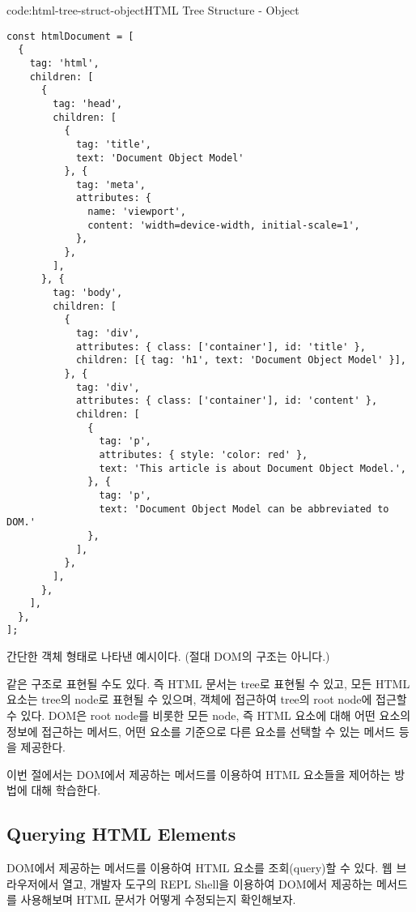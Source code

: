 \begin{codeenv}{code:html-tree-struct-object}{HTML Tree Structure - Object}\begin{verbatim}
const htmlDocument = [
  {
    tag: 'html',
    children: [
      {
        tag: 'head',
        children: [
          {
            tag: 'title',
            text: 'Document Object Model'
          }, {
            tag: 'meta',
            attributes: {
              name: 'viewport',
              content: 'width=device-width, initial-scale=1',
            },
          },
        ],
      }, {
        tag: 'body',
        children: [
          {
            tag: 'div',
            attributes: { class: ['container'], id: 'title' },
            children: [{ tag: 'h1', text: 'Document Object Model' }],
          }, {
            tag: 'div',
            attributes: { class: ['container'], id: 'content' },
            children: [
              {
                tag: 'p',
                attributes: { style: 'color: red' },
                text: 'This article is about Document Object Model.',
              }, {
                tag: 'p',
                text: 'Document Object Model can be abbreviated to DOM.'
              },
            ],
          },
        ],
      },
    ],
  },
];
\end{verbatim}
\end{codeenv}

\는 \을 간단한 객체 형태로 나타낸 예시이다. (절대 DOM의 구조는 아니다.)

    {}

\은 \와 같은 구조로 표현될 수도 있다. 즉 HTML 문서는 tree로 표현될 수 있고, 모든 HTML 요소는 tree의 node로 표현될 수 있으며,  객체에 접근하여 tree의 root node에 접근할 수 있다. DOM은 root node를 비롯한 모든 node, 즉 HTML 요소에 대해 어떤 요소의 정보에 접근하는 메서드, 어떤 요소를 기준으로 다른 요소를 선택할 수 있는 메서드 등을 제공한다.

이번 절에서는 DOM에서 제공하는 메서드를 이용하여 HTML 요소들을 제어하는 방법에 대해 학습한다.

\subsection*{Querying HTML Elements}

DOM에서 제공하는 메서드를 이용하여 HTML 요소를 조회(query)할 수 있다. \을 웹 브라우저에서 열고, 개발자 도구의 REPL Shell을 이용하여 DOM에서 제공하는 메서드를 사용해보며 HTML 문서가 어떻게 수정되는지 확인해보자.

